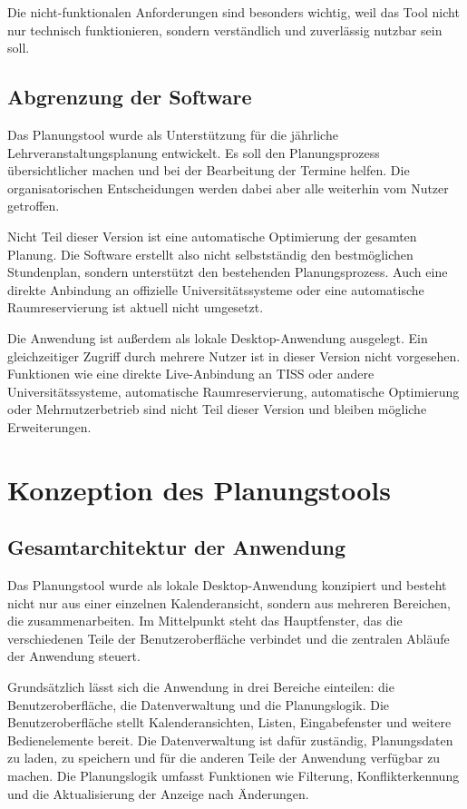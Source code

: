 \documentclass[12pt,a4paper]{article}
\begin{document}
Die nicht-funktionalen Anforderungen sind besonders wichtig, weil das Tool nicht nur technisch funktionieren, sondern verständlich und zuverlässig nutzbar sein soll.

\subsection{Abgrenzung der Software}

Das Planungstool wurde als Unterstützung für die jährliche Lehrveranstaltungsplanung entwickelt. Es soll den Planungsprozess übersichtlicher machen und bei der Bearbeitung der Termine helfen. Die organisatorischen Entscheidungen werden dabei aber alle weiterhin vom Nutzer getroffen.

Nicht Teil dieser Version ist eine automatische Optimierung der gesamten Planung. Die Software erstellt also nicht selbstständig den bestmöglichen Stundenplan, sondern unterstützt den bestehenden Planungsprozess. Auch eine direkte Anbindung an offizielle Universitätssysteme oder eine automatische Raumreservierung ist aktuell nicht umgesetzt.

Die Anwendung ist außerdem als lokale Desktop-Anwendung ausgelegt. Ein gleichzeitiger Zugriff durch mehrere Nutzer ist in dieser Version nicht vorgesehen. Funktionen wie eine direkte Live-Anbindung an TISS oder andere Universitätssysteme, automatische Raumreservierung, automatische Optimierung oder Mehrnutzerbetrieb sind nicht Teil dieser Version und bleiben mögliche Erweiterungen.

\clearpage

\section{Konzeption des Planungstools}

\subsection{Gesamtarchitektur der Anwendung}

Das Planungstool wurde als lokale Desktop-Anwendung konzipiert und besteht nicht nur aus einer einzelnen Kalenderansicht, sondern aus mehreren Bereichen, die zusammenarbeiten. Im Mittelpunkt steht das Hauptfenster, das die verschiedenen Teile der Benutzeroberfläche verbindet und die zentralen Abläufe der Anwendung steuert.

Grundsätzlich lässt sich die Anwendung in drei Bereiche einteilen: die Benutzeroberfläche, die Datenverwaltung und die Planungslogik. Die Benutzeroberfläche stellt Kalenderansichten, Listen, Eingabefenster und weitere Bedienelemente bereit. Die Datenverwaltung ist dafür zuständig, Planungsdaten zu laden, zu speichern und für die anderen Teile der Anwendung verfügbar zu machen. Die Planungslogik umfasst Funktionen wie Filterung, Konflikterkennung und die Aktualisierung der Anzeige nach Änderungen.
\end{document}
